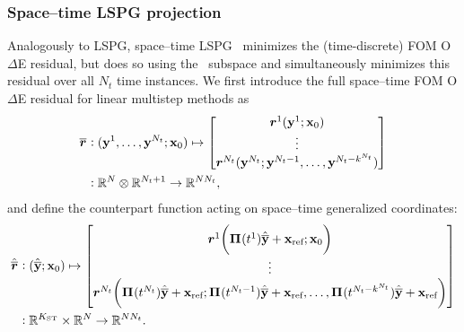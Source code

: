 \documentclass[3p,computermodern,10pt]{elsarticle}
\begin{document}
\subsubsection{Space--time LSPG projection} 
Analogously to LSPG, space--time LSPG~\cite{choi_stlspg}
minimizes the (time-discrete) FOM O$\Delta$E residual, but does so
using the \spaceTimeAcronym\ subspace and simultaneously minimizes this
residual over all $N_t$ time instances.
We first introduce the full space--time FOM O$\Delta$E residual for linear
multistep methods as
\begin{align*}
\overline{\boldsymbol r}_{} & \vcentcolon (\mathbf{y}^{1}, \ldots
	,\mathbf{y}^{N_t};{{\mathbf{x}}_0}) \mapsto \begin{bmatrix}
\boldsymbol r_{}^{1}(\mathbf{y}^{1}; {{\mathbf{x}}_0}) 
\\ 
\vdots \\
\boldsymbol r_{}^{N_t}(\mathbf{y}^{N_t};\mathbf{y}^{N_t-1},\ldots,\mathbf{y}^{N_t - k^{N_t}}) \end{bmatrix}  \\
& \vcentcolon \mathbb{R}^{N} \otimes \mathbb{R}^{N_t+1} \rightarrow \mathbb{R}^{N N_t},
\end{align*}
and define the counterpart function acting on space--time generalized
coordinates:
\begin{align*}
\hat{\overline{\boldsymbol r}}_{\text{}} & \vcentcolon (\hat{\mathbf{\overline{y}}} ;{{\mathbf{x}}_0}) \mapsto \begin{bmatrix}
\boldsymbol r_{}^{1}\bigg( \boldsymbol \Pi^{}(t^1)\hat{\mathbf{\overline{y}}} + \mathbf{x}_\text{ref}; {{\mathbf{x}}_0} \bigg)
\\ 
\vdots \\
\boldsymbol r_{}^{N_t}\bigg( \boldsymbol \Pi^{}(t^{N_t})\hat{\mathbf{\overline{y}}} + \mathbf{x}_\text{ref}; \boldsymbol \Pi^{}(t^{N_t-1})\hat{\mathbf{\overline{y}}} + \mathbf{x}_\text{ref} ,\ldots,  \boldsymbol \Pi^{}(t^{N_t-k^{N_t}})\hat{\mathbf{\overline{y}}} + \mathbf{x}_\text{ref} \bigg)  \\ 
\end{bmatrix}  \\
& \vcentcolon \mathbb{R}^{K_{\text{ST}}} \times \mathbb{R}^{N} \rightarrow \mathbb{R}^{N N_t}. 
\end{align*}
\end{document}
